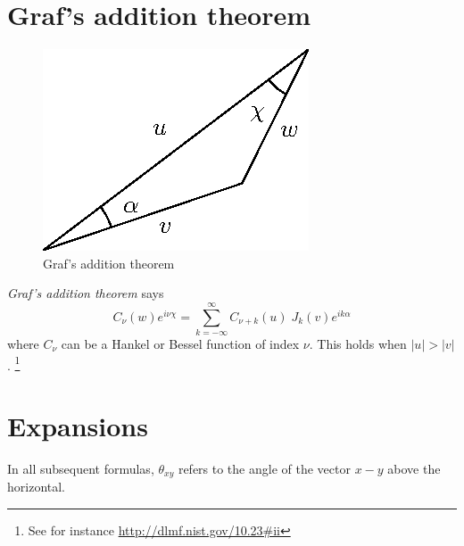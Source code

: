 \documentclass[10pt]{article}
\begin{document}
\section*{Graf's addition theorem}

\begin{figure}[H]
\centering
\includegraphics{media/graf.eps}
\caption{Graf's addition theorem}
\end{figure}

\emph{Graf's addition theorem} says
%
\[ C_\nu(w) e^{i \nu \chi} = \sum_{k = -\infty}^{\infty} C_{\nu + k}(u) \;
J_k(v) e^{i k \alpha} \]
%
where $C_\nu$ can be a Hankel or Bessel function of index $\nu$. This holds when
$|u| > |v|$. \footnote{See for instance \url{http://dlmf.nist.gov/10.23\#ii}}

\section*{Expansions}

In all subsequent formulas, $\theta_{xy}$ refers to the angle of the vector
$x-y$ above the horizontal.
\end{document}

